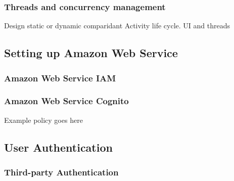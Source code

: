 \documentclass[a4paper, 11pt]{article}
\begin{document}
\subsubsection{Threads and concurrency management}
Design static or dynamic comparidant
Activity life cycle.
UI and threads

\subsection{Setting up Amazon Web Service}


\subsubsection{Amazon Web Service IAM}


\subsubsection{Amazon Web Service Cognito}

Example policy goes here

\subsection{User Authentication}
\subsubsection{Third-party Authentication}
\end{document}
